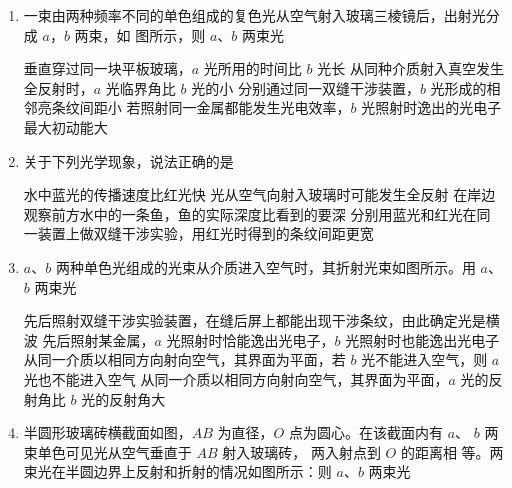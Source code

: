 

\begin{enumerate}
	\item
{}
一束由两种频率不同的单色组成的复色光从空气射入玻璃三棱镜后，出射光分成 $ a $，$ b $ 两束，如
图所示，则 $ a $、$ b $ 两束光  
\begin{figure}[h!]
	\centering
	
\end{figure}

\fourchoices
{垂直穿过同一块平板玻璃，$ a $ 光所用的时间比 $ b $ 光长}
{从同种介质射入真空发生全反射时，$ a $ 光临界角比 $ b $ 光的小}
{分别通过同一双缝干涉装置，$ b $ 光形成的相邻亮条纹间距小}
{若照射同一金属都能发生光电效率，$ b $ 光照射时逸出的光电子最大初动能大}



\item 
{}
关于下列光学现象，说法正确的是  

\fourchoices
{水中蓝光的传播速度比红光快}
{光从空气向射入玻璃时可能发生全反射}
{在岸边观察前方水中的一条鱼，鱼的实际深度比看到的要深}
{分别用蓝光和红光在同一装置上做双缝干涉实验，用红光时得到的条纹间距更宽}



\item 
{}
$ a $、$ b $ 两种单色光组成的光束从介质进入空气时，其折射光束如图所示。用 $ a $、$ b $ 两束光  
\begin{figure}[h!]
	\centering
	
\end{figure}

\fourchoices
{先后照射双缝干涉实验装置，在缝后屏上都能出现干涉条纹，由此确定光是横波}
{先后照射某金属，$ a $ 光照射时恰能逸出光电子，$ b $ 光照射时也能逸出光电子}
{从同一介质以相同方向射向空气，其界面为平面，若 $ b $ 光不能进入空气，则 $ a $ 光也不能进入空气}
{从同一介质以相同方向射向空气，其界面为平面，$ a $ 光的反射角比 $ b $ 光的反射角大}




\item 
{}
半圆形玻璃砖横截面如图，$ AB $ 为直径，$ O $ 点为圆心。在该截面内有 $ a $、
$ b $ 两束单色可见光从空气垂直于 $ AB $ 射入玻璃砖， 两入射点到 $ O $ 的距离相
等。两束光在半圆边界上反射和折射的情况如图所示：则 $ a $、$ b $ 两束光  
\begin{figure}[h!]
	\centering
	
\end{figure}


\end{enumerate}
